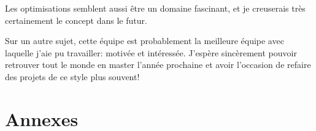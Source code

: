 \documentclass[
	headsepline=on,
	footsepline=on,
	twoside=off,
	abstract=on,
	DIV=10
]{scrreprt}
\begin{document}
				Les optimisations semblent aussi être un domaine fascinant, et je creuserais très certainement le concept dans le futur.
				
				Sur un autre sujet, cette équipe est probablement la meilleure équipe avec laquelle j'aie pu travailler: motivée et intéressée. 
				J'espère sincèrement pouvoir retrouver tout le monde en master l'année prochaine et avoir l'occasion de refaire des projets de ce style plus souvent!
				


			\cleardoublepage
			\pagebreak
			
		\part{Annexes}
		
			
	
	
\end{document}
